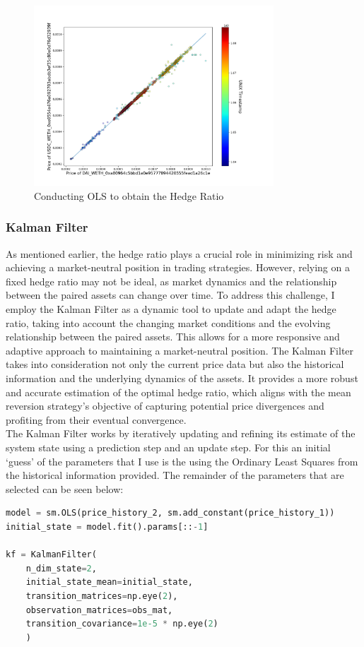 \begin{figure}[!htb]
    \centering
    \includegraphics[width=0.8\textwidth]{project/Images/simple_hedge_ratio.png}
    \caption{Conducting OLS to obtain the Hedge Ratio \label{fig:f1}}
\end{figure}

\subsubsection{Kalman Filter}
As mentioned earlier, the hedge ratio plays a crucial role in minimizing risk and achieving a market-neutral position in trading strategies. However, relying on a fixed hedge ratio may not be ideal, as market dynamics and the relationship between the paired assets can change over time. To address this challenge, I employ the Kalman Filter as a dynamic tool to update and adapt the hedge ratio, taking into account the changing market conditions and the evolving relationship between the paired assets. This allows for a more responsive and adaptive approach to maintaining a market-neutral position. The Kalman Filter takes into consideration not only the current price data but also the historical information and the underlying dynamics of the assets. It provides a more robust and accurate estimation of the optimal hedge ratio, which aligns with the mean reversion strategy's objective of capturing potential price divergences and profiting from their eventual convergence.
\\[5mm]
The Kalman Filter works by iteratively updating and refining its estimate of the system state using a prediction step and an update step. For this an initial `guess' of the parameters that I use is the using the Ordinary Least Squares from the historical information provided. The remainder of the parameters that are selected can be seen below:
\vspace{5mm}
\begin{lstlisting}[language=Python]
model = sm.OLS(price_history_2, sm.add_constant(price_history_1))
initial_state = model.fit().params[::-1]

kf = KalmanFilter(
    n_dim_state=2,
    initial_state_mean=initial_state,
    transition_matrices=np.eye(2),
    observation_matrices=obs_mat,
    transition_covariance=1e-5 * np.eye(2)
    )
\end{lstlisting}
\vspace{5mm}

